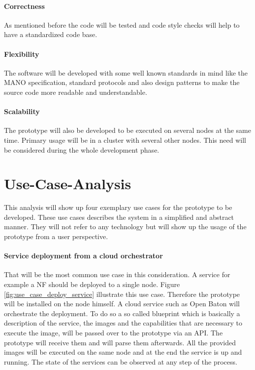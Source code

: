 \paragraph{Correctness} As mentioned before the code will be tested and code style checks will help to have a standardized code base.
\paragraph{Flexibility} The software will be developed with some well known standards in mind like the \ac{MANO} specification, standard protocols and also design patterns to make the source code more readable and understandable.
\paragraph{Scalability} The prototype will also be developed to be executed on several nodes at the same time.
Primary usage will be in a cluster with several other nodes.
This need will be considered during the whole development phase.


\section{Use-Case-Analysis}
\label{section:use-case-analysis}
This analysis will show up four exemplary use cases for the prototype to be developed.
These use cases describes the system in a simplified and abstract manner.
They will not refer to any technology but will show up the usage of the prototype from a user perspective.

\paragraph{Service deployment from a cloud orchestrator}
That will be the most common use case in this consideration.
A service for example a \ac{NF} should be deployed to a single node.
Figure \ref{fig:use_case_deploy_service} illustrate this use case.
Therefore the prototype will be installed on the node himself.
A cloud service such as Open Baton will orchestrate the deployment.
To do so a so called blueprint which is basically a description of the service, the images and the capabilities that are necessary to execute the image, will be passed over to the prototype via an \ac{API}.
The prototype will receive them and will parse them afterwards.
All the provided images will be executed on the same node and at the end the service is up and running.
The state of the services can be observed at any step of the process.

